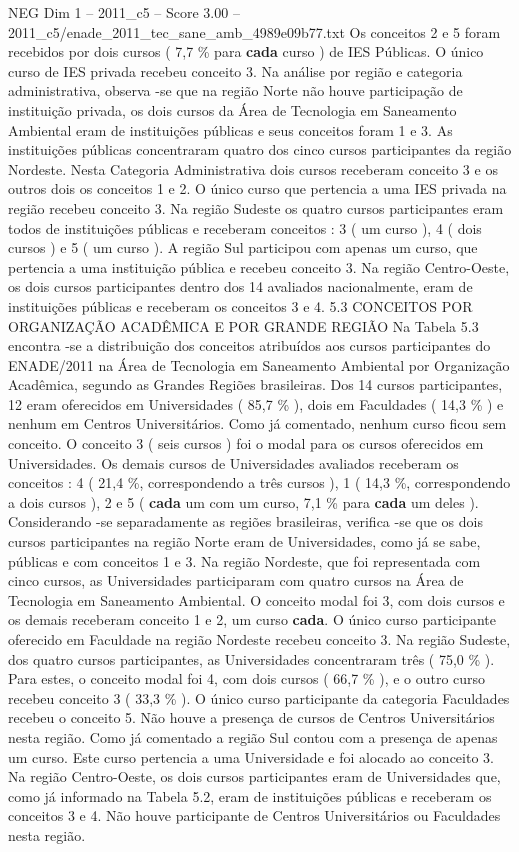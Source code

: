 \begin{textsample}{NEG Dim 1 – 2011\_c5 – Score 3.00 – 2011\_c5/enade\_2011\_tec\_sane\_amb\_4989e09b77.txt}
Os conceitos 2 e 5 foram recebidos por dois cursos ( 7,7 \% para \textbf{cada} curso ) de IES Públicas.
O único curso de IES privada recebeu conceito 3.
Na análise por região e categoria administrativa, observa -se que na região Norte não houve participação de instituição privada, os dois cursos da Área de Tecnologia em Saneamento Ambiental eram de instituições públicas e seus conceitos foram 1 e 3.
As instituições públicas concentraram quatro dos cinco cursos participantes da região Nordeste.
Nesta Categoria Administrativa dois cursos receberam conceito 3 e os outros dois os conceitos 1 e 2.
O único curso que pertencia a uma IES privada na região recebeu conceito 3.
Na região Sudeste os quatro cursos participantes eram todos de instituições públicas e receberam conceitos : 3 ( um curso ), 4 ( dois cursos ) e 5 ( um curso ).
A região Sul participou com apenas um curso, que pertencia a uma instituição pública e recebeu conceito 3.
Na região Centro-Oeste, os dois cursos participantes dentro dos 14 avaliados nacionalmente, eram de instituições públicas e receberam os conceitos 3 e 4. 5.3 CONCEITOS POR ORGANIZAÇÃO ACADÊMICA E POR GRANDE REGIÃO Na Tabela 5.3 encontra -se a distribuição dos conceitos atribuídos aos cursos participantes do ENADE/2011 na Área de Tecnologia em Saneamento Ambiental por Organização Acadêmica, segundo as Grandes Regiões brasileiras.
Dos 14 cursos participantes, 12 eram oferecidos em Universidades ( 85,7 \% ), dois em Faculdades ( 14,3 \% ) e nenhum em Centros Universitários.
Como já comentado, nenhum curso ficou sem conceito.
O conceito 3 ( seis cursos ) foi o modal para os cursos oferecidos em Universidades.
Os demais cursos de Universidades avaliados receberam os conceitos : 4 ( 21,4 \%, correspondendo a três cursos ), 1 ( 14,3 \%, correspondendo a dois cursos ), 2 e 5 ( \textbf{cada} um com um curso, 7,1 \% para \textbf{cada} um deles ).
Considerando -se separadamente as regiões brasileiras, verifica -se que os dois cursos participantes na região Norte eram de Universidades, como já se sabe, públicas e com conceitos 1 e 3.
Na região Nordeste, que foi representada com cinco cursos, as Universidades participaram com quatro cursos na Área de Tecnologia em Saneamento Ambiental.
O conceito modal foi 3, com dois cursos e os demais receberam conceito 1 e 2, um curso \textbf{cada}.
O único curso participante oferecido em Faculdade na região Nordeste recebeu conceito 3.
Na região Sudeste, dos quatro cursos participantes, as Universidades concentraram três ( 75,0 \% ).
Para estes, o conceito modal foi 4, com dois cursos ( 66,7 \% ), e o outro curso recebeu conceito 3 ( 33,3 \% ).
O único curso participante da categoria Faculdades recebeu o conceito 5.
Não houve a presença de cursos de Centros Universitários nesta região.
Como já comentado a região Sul contou com a presença de apenas um curso.
Este curso pertencia a uma Universidade e foi alocado ao conceito 3.
Na região Centro-Oeste, os dois cursos participantes eram de Universidades que, como já informado na Tabela 5.2, eram de instituições públicas e receberam os conceitos 3 e 4.
Não houve participante de Centros Universitários ou Faculdades nesta região.

\end{textsample}
